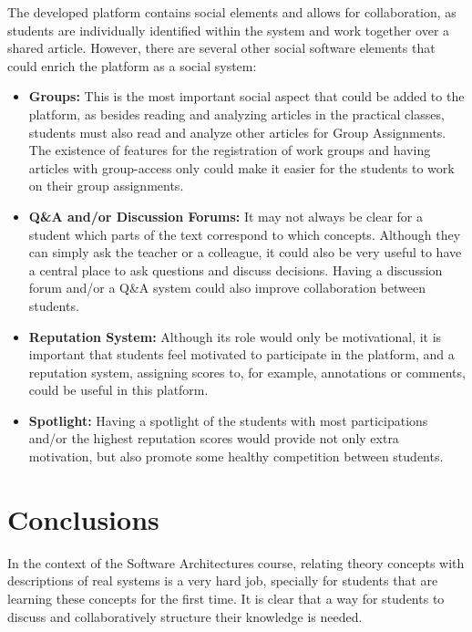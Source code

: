 \documentclass{llncs}
\begin{document}
The developed platform contains social elements and allows for collaboration, as students are individually identified within the system and work together over a shared article. However, there are several other social software elements that could enrich the platform as a social system:

\begin{itemize}
\item \textbf{Groups:} This is the most important social aspect that could be added to the platform, as besides reading and analyzing articles in the practical classes, students must also read and analyze other articles for Group Assignments. The existence of features for the registration of work groups and having articles with group-access only could make it easier for the students to work on their group assignments.

\item \textbf{Q\&A and/or Discussion Forums:} It may not always be clear for a student which parts of the text correspond to which concepts. Although they can simply ask the teacher or a colleague, it could also be very useful to have a central place to ask questions and discuss decisions. Having a discussion forum and/or a Q\&A system could also improve collaboration between students.

\item \textbf{Reputation System: } Although its role would only be motivational, it is important that students feel motivated to participate in the platform, and a reputation system, assigning scores to, for example, annotations or comments, could be useful in this platform.

\item \textbf{Spotlight: } Having a spotlight of the students with most participations and/or the highest reputation scores would provide not only extra motivation, but also promote some healthy competition between students.
\end{itemize}


\section{Conclusions}

In the context of the Software Architectures course, relating theory concepts with descriptions of real systems is a very hard job, specially for students that are learning these concepts for the first time. It is clear that a way for students to discuss and collaboratively structure their knowledge is needed.
\end{document}
